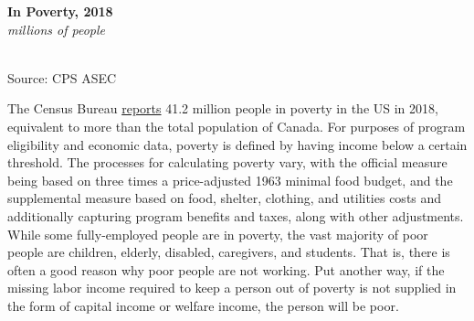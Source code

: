 \documentclass{report}
\newcommand{\barylab}[2]{yticklabel style={text width=#1, align=right, 
		style={black!70}, text height=#2},}
\newcommand{\bbar}[2]{extra #1 ticks = {{#2}}, extra #1 tick labels = ,
		extra #1 tick style = {grid=major, grid style={thick, black!25}},}
\newcommand{\barplotnogrid}{xbar=0pt, axis line style={draw=none},
	    yticklabel style={align=left, anchor=east},
      		xmajorticks=false, ymajorgrids=false,   
	    ytick=data, tickwidth=0pt, area legend, reverse legend,
	    nodes near coords, nodes near coords align={horizontal},}
\begin{document}
{{{\begin{minipage}{0.43\textwidth}
\end{minipage} \hspace{6mm}
\begin{minipage}{0.22\textwidth}
\noindent \normalsize \textbf{In Poverty, 2018}\\
\footnotesize{\textit{millions of people}}\\ 
  \noindent \hspace*{-4mm} \\
\footnotesize{Source: CPS ASEC}
\end{minipage}

\begin{minipage}{0.76\textwidth}

\small The Census Bureau \href{https://www.census.gov/library/publications/2019/demo/p60-268.html}{reports} 41.2 million people in poverty in the US in 2018, equivalent to more than the total population of Canada. For purposes of program eligibility and economic data, poverty is defined by having income below a certain threshold. The processes for calculating poverty vary, with the official measure being based on three times a price-adjusted 1963 minimal food budget, and the supplemental measure based on food, shelter, clothing, and utilities costs and additionally capturing program benefits and taxes, along with other adjustments.\\

While some fully-employed people are in poverty, the vast majority of poor people are children, elderly, disabled, caregivers, and students. That is, there is often a good reason why poor people are not working. Put another way, if the missing labor income required to keep a person out of poverty is not supplied in the form of capital income or welfare income, the person will be poor.\\


\end{minipage}}}}
\end{document}
